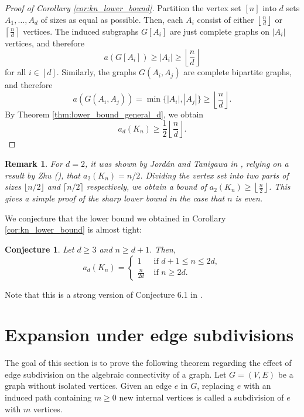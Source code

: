 \documentclass[a4paper,11pt]{article}
\theoremstyle{plain}
\newtheorem{remark}[theorem]{\bf Remark}
\newtheorem{conjecture}[theorem]{\bf Conjecture}
\theoremstyle{definition}
\newcommand{\lfrac}[2]{\left\lfloor\frac{#1}{#2}\right\rfloor}
\begin{document}
\begin{proof}[Proof of Corollary \ref{cor:kn_lower_bound}]
Partition the vertex set $[n]$ into $d$ sets $A_1,\ldots, A_d$ of sizes as equal as possible. Then, each $A_i$ consist of either $\left\lfloor\frac{n}{d}\right\rfloor$ or $\left\lceil\frac{n}{d}\right\rceil$ vertices. 
The induced subgraphs $G[A_i]$ are just complete graphs on $|A_i|$ vertices, and therefore \[a(G[A_i])\geq |A_i| \geq \lfrac{n}{d}\] for all $i\in[d]$. Similarly, the graphs $G(A_i,A_j)$ are complete bipartite graphs, and therefore \[a(G(A_i,A_j))=\min\{|A_i|,|A_j|\}\geq \lfrac{n}{d}.\]
By Theorem \ref{thm:lower_bound_general_d}, we obtain
\[
    a_d(K_n)\geq \frac{1}{2}\lfrac{n}{d}.
\]
\end{proof}

\begin{remark}
For $d=2$, it was shown by Jord\'an and Tanigawa in \cite{jordan2022rigidity}, relying on a result by Zhu (\cite{zhu2013quantitative}), that $a_2(K_n)=n/2$. Dividing the vertex set into two parts of sizes $\lfloor n/2 \rfloor$ and $\lceil n/2 \rceil$ respectively, we obtain a bound of $a_2(K_n)\geq \lfrac{n}{2}$. This gives a simple proof of the sharp lower bound in the case that $n$ is even.
\end{remark}

We conjecture that the lower bound we obtained in Corollary \ref{cor:kn_lower_bound} is almost tight:

\begin{conjecture}\label{conj:complete}
Let $d\geq 3$ and $n\geq d+1$. Then,
\[
a_d(K_n)=\begin{cases}
1 & \text{ if }  d+1\leq n\leq 2d,\\
\frac{n}{2d} & \text{ if } n\geq 2d.
\end{cases}
\]
\end{conjecture}
Note that this is a strong version of Conjecture 6.1 in \cite{lew2022d}.






\section{Expansion under edge subdivisions}\label{sec:subdivisions}
The goal of this section is to prove the following theorem regarding the effect of edge subdivision on the algebraic connectivity of a graph. Let $G=(V,E)$ be a graph without isolated vertices. Given an edge $e$ in  $G$, replacing $e$ with an induced path containing $m\ge 0$ new internal vertices is called a subdivision of $e$ with $m$ vertices. 
\end{document}
